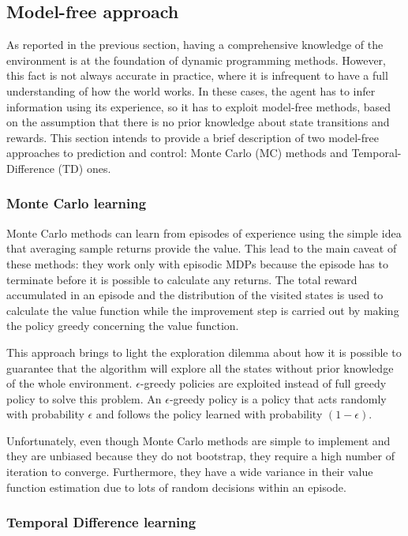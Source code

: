 \subsection{Model-free approach} \label{mfa}

As reported in the previous section, having a comprehensive knowledge of the environment is at the foundation of dynamic programming methods. However, this fact is not always accurate in practice, where it is infrequent to have a full understanding of how the world works. In these cases, the agent has to infer information using its experience, so it has to exploit model-free methods, based on the assumption that there is no prior knowledge about state transitions and rewards.
This section intends to provide a brief description of two model-free approaches to prediction and control: Monte Carlo (MC) methods and Temporal-Difference (TD) ones.

\subsubsection{Monte Carlo learning}

Monte Carlo methods \cite[Chapter 6]{sutton2018reinforcement} can learn from episodes of experience using the simple idea that averaging sample returns provide the value. This lead to the main caveat of these methods: they work only with episodic MDPs because the episode has to terminate before it is possible to calculate any returns.
The total reward accumulated in an episode and the distribution of the visited states is used to calculate the value function while the improvement step is carried out by making the policy greedy concerning the value function.

This approach brings to light the exploration dilemma about how it is possible to guarantee that the algorithm will explore all the states without prior knowledge of the whole environment. $\epsilon$-greedy policies are exploited instead of full greedy policy to solve this problem.
An $\epsilon$-greedy policy is a policy that acts randomly with probability $\epsilon$ and follows the policy learned with probability $(1-\epsilon)$.

Unfortunately, even though Monte Carlo methods are simple to implement and they are unbiased because they do not bootstrap, they require a high number of iteration to converge. Furthermore, they have a wide variance in their value function estimation due to lots of random decisions within an episode.

\subsubsection{Temporal Difference learning} \label{tdlearn}

